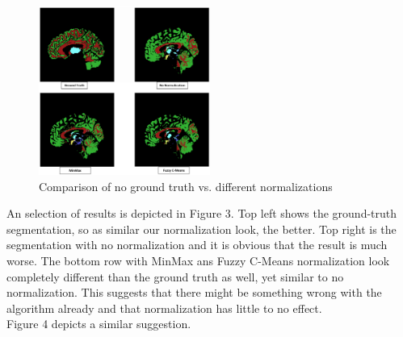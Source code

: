 \documentclass[journal]{IEEEtran}
\begin{document}
	\begin{figure}[h]
		\centering
		\includegraphics[width=0.5\textwidth]{compNorms.png}
		\caption{Comparison of no ground truth vs. different normalizations}
		\label{fig:e1}
	\end{figure}

An selection of results is depicted in Figure 3. Top left shows the ground-truth segmentation, so as similar our normalization look, the better.
Top right is the segmentation with no normalization and it is obvious that the result is much worse. The bottom row with MinMax ans Fuzzy C-Means
normalization look completely different than the ground truth as well, yet similar to no normalization. This suggests that there might be something wrong with
the algorithm already and that normalization has little to no effect. \\

Figure 4 depicts a similar suggestion.
\end{document}
